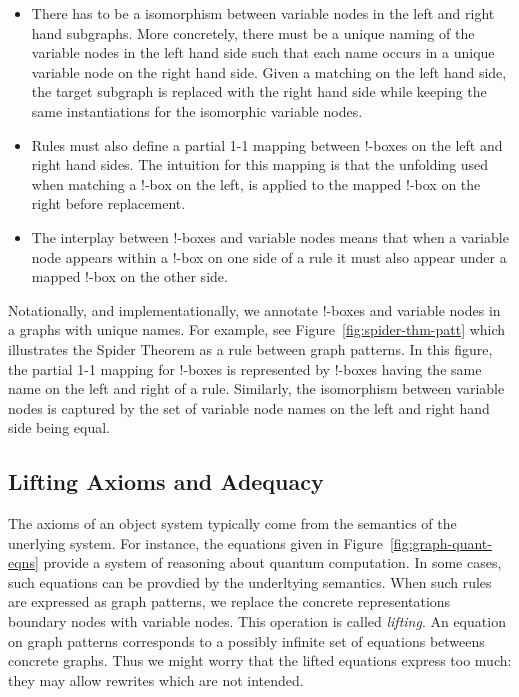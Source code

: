 \documentclass[runningheads]{llncs}
\begin{document}
\begin{itemize}

\item There has to be a isomorphism between variable nodes in the left
  and right hand subgraphs. More concretely, there must be a unique
  naming of the variable nodes in the left hand side such that each
  name occurs in a unique variable node on the right hand side. Given
  a matching on the left hand side, the target subgraph is replaced
  with the right hand side while keeping the same instantiations for
  the isomorphic variable nodes.

\item Rules must also define a partial 1-1 mapping between !-boxes on
  the left and right hand sides. The intuition for this mapping is
  that the unfolding used when matching a !-box on the left, is
  applied to the mapped !-box on the right before replacement.

\item The interplay between !-boxes and variable nodes means that when
  a variable node appears within a !-box on one side of a rule it must
  also appear under a mapped !-box on the other side.

\end{itemize}

Notationally, and implementationally, we annotate !-boxes and variable
nodes in a graphs with unique names. For example, see
Figure~\ref{fig:spider-thm-patt} which illustrates the Spider Theorem
as a rule between graph patterns. In this figure, the partial 1-1
mapping for !-boxes is represented by !-boxes having the same name on
the left and right of a rule.  Similarly, the isomorphism between
variable nodes is captured by the set of variable node names on the
left and right hand side being equal.

\subsection{Lifting Axioms and Adequacy} 

The axioms of an object system typically come from the semantics of
the unerlying system. For instance, the equations given in
Figure~\ref{fig:graph-quant-eqns} provide a system of reasoning about
quantum computation. In some cases, such equations can be provdied by
the underltying semantics. When such rules are expressed as graph
patterns, we replace the concrete representations boundary nodes with
variable nodes. This operation is called \emph{lifting}. An equation
on graph patterns corresponds to a possibly infinite set of equations
betweens concrete graphs. Thus we might worry that the lifted
equations express too much: they may allow rewrites which are not
intended. 
\end{document}
